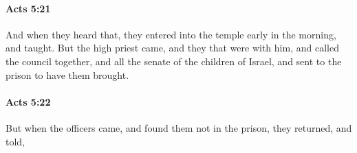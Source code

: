 		\paragraph{Acts 5:21} %
			\label{ACTS-5-21}

			And when they heard that, they entered into the temple early in the morning, and taught.  But the high priest came, and they that were with him, and called the council together, and all the senate of the children of Israel, and sent to the prison to have them brought.

			\begin{framed}
			\scriptsize
				\begin{compactdesc}
					\item[SBLG] 
				\end{compactdesc}
			\end{framed}

		\paragraph{Acts 5:22} %
			\label{ACTS-5-22}

			But when the officers came, and found them not in the prison, they returned, and told,

